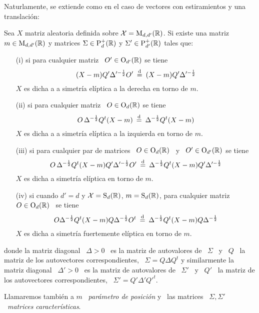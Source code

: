 Naturlamente, se  extiende como en el  caso de vectores con  estiramientos y una
translaci\'on:
%
\begin{definicion}
%
  Sea $X$ matriz aleatoria definida  sobre $\mathcal{X} = \mathrm{M}_{d,d'}(\mathbb{R})$.  Si existe
  una matriz $m \in  \mathrm{M}_{d,d'}(\mathbb{R})$ y matrices $\Sigma \in \mathrm{P}_d^+(\mathbb{R})$
  y $\Sigma' \in \mathrm{P}_{d'}^+(\mathbb{R})$ tales que:
  \begin{enumerate}%
  \item[(i)] si para cualquier matriz \ $O' \in \mathrm{O}_{d'}(\mathbb{R})$ se tiene
    \[
    (X-m) Q' \Delta'^{-\frac12} O' \: \stackrel{\mathrm{d}}{=} \: (X-m) Q' \Delta'^{-\frac12}
    \]
    $X$ es dicha a a simetr\'ia el\'iptica a la derecha en torno de $m$.
  \item[(ii)] si para cualquier matriz \ $O \in \mathrm{O}_d(\mathbb{R})$ se tiene
    \[
    O \, \Delta^{-\frac12} Q^t (X-m) \: \stackrel{\mathrm{d}}{=} \: \Delta^{-\frac12} Q^t (X-m)
    \]
    $X$ es dicha a a simetr\'ia el\'iptica a la izquierda en torno de $m$.
  \item[(iii)] si para  cualquier par de matrices \ $O \in  \mathrm{O}_d(\mathbb{R})$ \ y \
    $O' \in \mathrm{O}_{d'}(\mathbb{R})$ se tiene
    \[
    O  \, \Delta^{-\frac12}  Q^t (X-m)  Q'  \Delta'^{-\frac12} O'  \: \stackrel{\mathrm{d}}{=}  \:
    \Delta^{-\frac12} Q^t (X-m) Q' \Delta'^{-\frac12}
    \]
    $X$ es dicha a simetr\'ia el\'iptica en torno de $m$.
  \item[(iv)] si  cuando $d' = d$  y $\mathcal{X} = \mathrm{S}_d(\mathbb{R})$,  $m = \mathrm{S}_d(\mathbb{R})$,
    para cualquier matriz \ $O \in \mathrm{O}_d(\mathbb{R})$ \ se tiene
    \[
    O \Delta^{-\frac12} Q^t (X-m) Q \Delta^{-\frac12} O^t \: \stackrel{\mathrm{d}}{=} \: \Delta^{-\frac12} Q^t (X-m) Q \Delta^{-\frac12}
    \]
    $X$ es dicha a simetr\'ia fuertemente el\'iptica en torno de $m$.
  \end{enumerate}
  donde la  matriz diagonal \ $\Delta  > 0$ \ es  la matriz de  autovalores de \
  $\Sigma$ \ y \ $Q$ \ la matriz de los autovectores correspondientes, \ $\Sigma
  = Q  \Delta Q^t$ y  similarmente la matriz  diagonal \ $\Delta'  > 0$ \  es la
  matriz  de  autovalores  de \  $\Sigma'$  \  y  \  $Q'$  \ la  matriz  de  los
  autovectores correspondientes, \ $\Sigma' = Q' \Delta' Q'^t$.

  Llamaremos tambi\'en a $m$ \  {\em par\'ametro  de posici\'on} y  \ las  matrices \
  $\Sigma, \Sigma'$ \ {\em matrices caracter\'isticas}.

\end{definicion}

